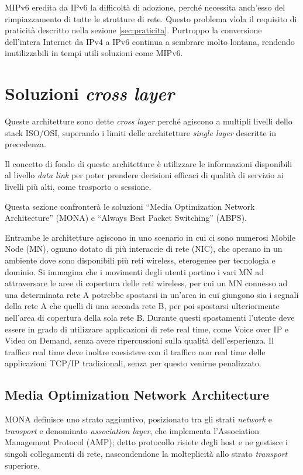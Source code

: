 \documentclass[12pt,a4paper,openright,twoside]{book}
\begin{document}
MIPv6 eredita da IPv6 la difficoltà di adozione, perché necessita
anch'esso del rimpiazzamento di tutte le strutture di rete. Questo
problema vìola il requisito di praticità descritto nella sezione
\ref{sec:praticita}. Purtroppo la conversione dell'intera Internet
da IPv4 a IPv6 continua a sembrare molto lontana, rendendo
inutilizzabili in tempi utili soluzioni come MIPv6.

\section{Soluzioni \emph{cross layer}}
Queste architetture sono dette \emph{cross layer} perché agiscono a
multipli livelli dello stack ISO/OSI, superando i limiti delle
architetture \emph{single layer} descritte in precedenza.

Il concetto di fondo di queste architetture è utilizzare le
informazioni disponibili al livello \emph{data link} per poter
prendere decisioni efficaci di qualità di servizio ai livelli più
alti, come trasporto o sessione.

Questa sezione confronterà le soluzioni ``Media Optimization Network
Architecture'' (MONA) e ``Always Best Packet Switching'' (ABPS).

Entrambe le architetture agiscono in uno scenario in cui ci sono
numerosi Mobile Node (MN), ognuno dotato di più interaccie di rete
(NIC), che operano in un ambiente dove sono disponibili più reti
wireless, eterogenee per tecnologia e dominio. Si immagina che i
movimenti degli utenti portino i vari MN ad attraversare le aree di
copertura delle reti wireless, per cui un MN connesso ad una
determinata rete A potrebbe spostarsi in un'area in cui giungono sia i
segnali della rete A che quelli di una seconda rete B, per poi
spostarsi ulteriormente nell'area di copertura della sola rete
B. Durante questi spostamenti l'utente deve essere in grado di
utilizzare applicazioni di rete real time, come Voice over IP e Video
on Demand, senza avere ripercussioni sulla qualità dell'esperienza. Il
traffico real time deve inoltre coesistere con il traffico non real
time delle applicazioni TCP/IP tradizionali, senza per questo venirne
penalizzato.

\subsection{Media Optimization Network Architecture}

MONA definisce uno strato aggiuntivo, posizionato tra gli strati
\emph{network} e \emph{transport} e denominato \emph{association
  layer}, che implementa l'Association Management Protocol (AMP);
detto protocollo risiete degli host e ne gestisce i singoli
collegamenti di rete, nascondendone la molteplicità allo strato
\emph{transport} superiore.
\end{document}
